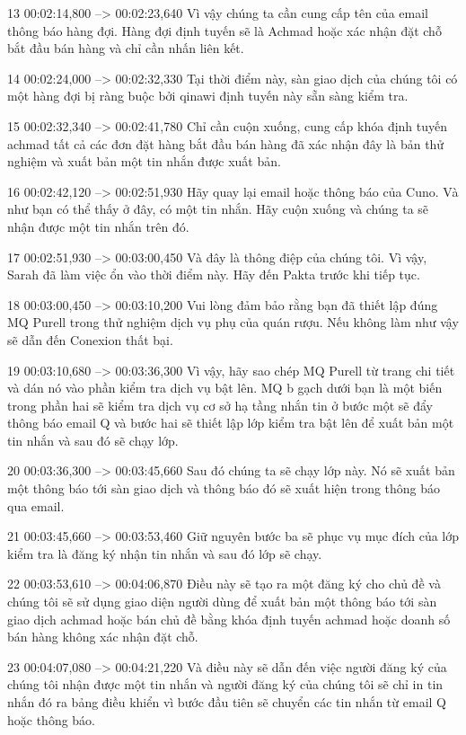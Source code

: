 13
00:02:14,800 --> 00:02:23,640
Vì vậy chúng ta cần cung cấp tên của email thông báo hàng đợi.  Hàng đợi định tuyến sẽ là Achmad hoặc xác nhận đặt chỗ bắt đầu bán hàng và chỉ cần nhấn liên kết.

14
00:02:24,000 --> 00:02:32,330
Tại thời điểm này, sàn giao dịch của chúng tôi có một hàng đợi bị ràng buộc bởi qinawi định tuyến này sẵn sàng kiểm tra.

15
00:02:32,340 --> 00:02:41,780
Chỉ cần cuộn xuống, cung cấp khóa định tuyến achmad tất cả các đơn đặt hàng bắt đầu bán hàng đã xác nhận đây là bản thử nghiệm và xuất bản một tin nhắn được xuất bản.

16
00:02:42,120 --> 00:02:51,930
Hãy quay lại email hoặc thông báo của Cuno.  Và như bạn có thể thấy ở đây, có một tin nhắn.  Hãy cuộn xuống và chúng ta sẽ nhận được một tin nhắn trên đó.

17
00:02:51,930 --> 00:03:00,450
Và đây là thông điệp của chúng tôi.  Vì vậy, Sarah đã làm việc ổn vào thời điểm này.  Hãy đến Pakta trước khi tiếp tục.

18
00:03:00,450 --> 00:03:10,200
Vui lòng đảm bảo rằng bạn đã thiết lập đúng MQ Purell trong thử nghiệm dịch vụ phụ của quán rượu.  Nếu không làm như vậy sẽ dẫn đến Conexion thất bại.

19
00:03:10,680 --> 00:03:36,300
Vì vậy, hãy sao chép MQ Purell từ trang chi tiết và dán nó vào phần kiểm tra dịch vụ bật lên.  MQ b gạch dưới bạn là một biến trong phần hai sẽ kiểm tra dịch vụ cơ sở hạ tầng nhắn tin ở bước một sẽ đẩy thông báo email Q và bước hai sẽ thiết lập lớp kiểm tra bật lên để xuất bản một tin nhắn và sau đó sẽ chạy lớp.

20
00:03:36,300 --> 00:03:45,660
Sau đó chúng ta sẽ chạy lớp này.  Nó sẽ xuất bản một thông báo tới sàn giao dịch và thông báo đó sẽ xuất hiện trong thông báo qua email.

21
00:03:45,660 --> 00:03:53,460
Giữ nguyên bước ba sẽ phục vụ mục đích của lớp kiểm tra là đăng ký nhận tin nhắn và sau đó lớp sẽ chạy.

22
00:03:53,610 --> 00:04:06,870
Điều này sẽ tạo ra một đăng ký cho chủ đề và chúng tôi sẽ sử dụng giao diện người dùng để xuất bản một thông báo tới sàn giao dịch achmad hoặc bán chủ đề bằng khóa định tuyến achmad hoặc doanh số bán hàng không xác nhận đặt chỗ.

23
00:04:07,080 --> 00:04:21,220
Và điều này sẽ dẫn đến việc người đăng ký của chúng tôi nhận được một tin nhắn và người đăng ký của chúng tôi sẽ chỉ in tin nhắn đó ra bảng điều khiển vì bước đầu tiên sẽ chuyển các tin nhắn từ email Q hoặc thông báo.

